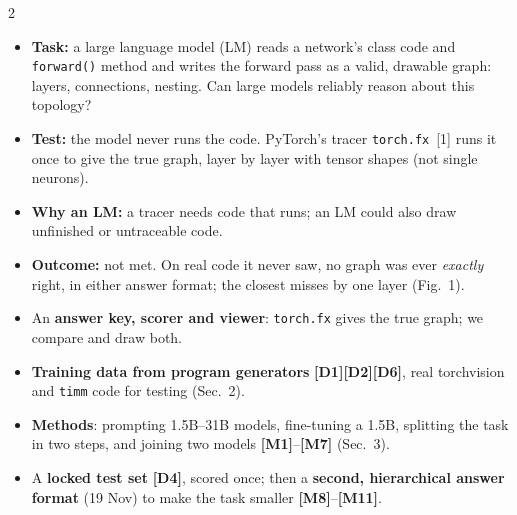 \documentclass[10pt]{article}
\newcommand{\tg}[1]{\textcolor{tagc}{\textbf{[#1]}}}
\newcommand{\sect}[1]{\vspace{1pt}{\large\bfseries #1}\par}
\begin{document}
\small

\noindent{}
\vspace{2pt}

\begin{multicols}{2}
\sect{Abstract}
\begin{itemize}
\item \textbf{Task:} a large language model (LM) reads a network's class code and \texttt{forward()} method and
writes the forward pass as a valid, drawable graph: layers, connections, nesting. Can large models reliably reason
about this topology?
\item \textbf{Test:} the model never runs the code. PyTorch's tracer \texttt{torch.fx}~[1] runs it once to give
the true graph, layer by layer with tensor shapes (not single neurons).
\item \textbf{Why an LM:} a tracer needs code that runs; an LM could also draw unfinished or untraceable code.
\item \textbf{Outcome:} not met. On real code it never saw, no graph was ever \emph{exactly} right, in either
answer format; the closest misses by one layer (Fig.~1).
\end{itemize}

\sect{1\quad What we did, in short}
\begin{itemize}
\item An \textbf{answer key, scorer and viewer}: \texttt{torch.fx} gives the true graph; we compare and draw both.
\item \textbf{Training data from program generators} \tg{D1}\tg{D2}\tg{D6}, real torchvision and \texttt{timm}
code for testing (Sec.~2).
\item \textbf{Methods}: prompting 1.5B--31B models, fine-tuning a 1.5B, splitting the task in two steps, and joining
two models \tg{M1}--\tg{M7} (Sec.~3).
\item A \textbf{locked test set} \tg{D4}, scored once; then a \textbf{second, hierarchical answer format} (19 Nov) to make the task smaller \tg{M8}--\tg{M11}.
\end{itemize}


\end{multicols}
\end{document}
